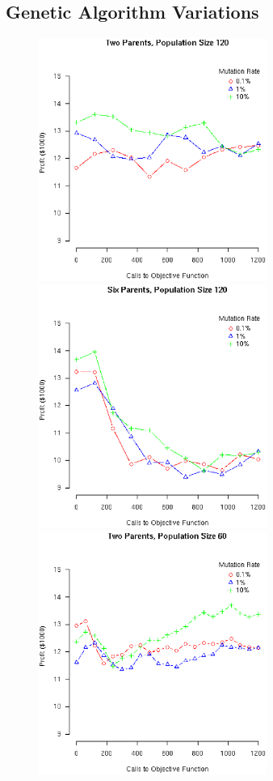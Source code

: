 \documentclass[12pt]{article}
\begin{document}
\subsection{Genetic Algorithm Variations}

\begin{figure}[!ht]
  \begin{minipage}[b]{0.5\linewidth}
    \includegraphics[width=7.5cm]{Gen2ParentsPop120.eps}
  \end{minipage}
  \begin{minipage}[b]{0.5\linewidth}
    \includegraphics[width=7.5cm]{Gen6ParentsPop120.eps}
  \end{minipage}
  \begin{minipage}[b]{0.5\linewidth}
    \includegraphics[width=7.5cm]{Gen2ParentsPop60.eps}

\end{minipage}
\end{figure}
\end{document}
